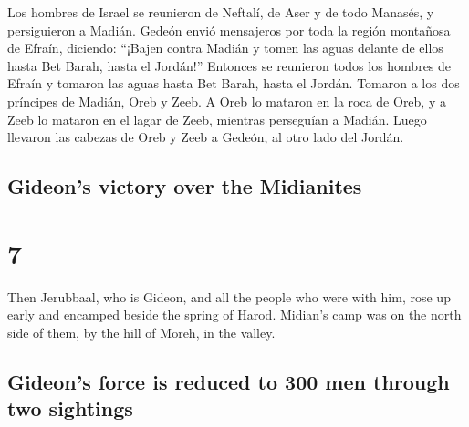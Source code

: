 \begin{paracol}{2}
 Los hombres de Israel se reunieron de Neftalí, de Aser y
de todo Manasés, y persiguieron a Madián.  Gedeón envió
mensajeros por toda la región montañosa de Efraín, diciendo: ``¡Bajen
contra Madián y tomen las aguas delante de ellos hasta Bet Barah, hasta
el Jordán!'' Entonces se reunieron todos los hombres de Efraín y tomaron
las aguas hasta Bet Barah, hasta el Jordán.  Tomaron a
los dos príncipes de Madián, Oreb y Zeeb. A Oreb lo mataron en la roca
de Oreb, y a Zeeb lo mataron en el lagar de Zeeb, mientras perseguían a
Madián. Luego llevaron las cabezas de Oreb y Zeeb a Gedeón, al otro lado
del Jordán.

\switchcolumn
\begin{otherlanguage}{english}

\hypertarget{gideons-victory-over-the-midianites}{%
\subsection{Gideon's victory over the
Midianites}\label{gideons-victory-over-the-midianites}}

\hypertarget{section-13}{%
\section{7}\label{section-13}}

 Then Jerubbaal, who is Gideon, and all the people who
were with him, rose up early and encamped beside the spring of Harod.
Midian's camp was on the north side of them, by the hill of Moreh, in
the valley.

\hypertarget{gideons-force-is-reduced-to-300-men-through-two-sightings}{%
\subsection{Gideon's force is reduced to 300 men through two
sightings}\label{gideons-force-is-reduced-to-300-men-through-two-sightings}}


\end{otherlanguage}
\end{paracol}

